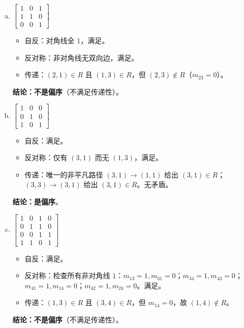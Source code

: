 \documentclass[11pt,UTF8]{article}
\begin{document}
\begin{enumerate}[a)]
    \item $\begin{bmatrix} 1 & 0 & 1 \\ 1 & 1 & 0 \\ 0 & 0 & 1 \end{bmatrix}$
    \begin{itemize}
        \item 自反：对角线全 $1$，满足。
        \item 反对称：非对角线无双向边，满足。
        \item 传递：$(2,1) \in R$ 且 $(1,3) \in R$，但 $(2,3) \notin R$（$m_{23}=0$）。
    \end{itemize}
    \textbf{结论：不是偏序}（不满足传递性）。

    \item $\begin{bmatrix} 1 & 0 & 0 \\ 0 & 1 & 0 \\ 1 & 0 & 1 \end{bmatrix}$
    \begin{itemize}
        \item 自反：满足。
        \item 反对称：仅有 $(3,1)$ 而无 $(1,3)$，满足。
        \item 传递：唯一的非平凡路径 $(3,1)\to(1,1)$ 给出 $(3,1) \in R$；$(3,3)\to(3,1)$ 给出 $(3,1) \in R$。无矛盾。
    \end{itemize}
    \textbf{结论：是偏序}。

    \item $\begin{bmatrix} 1 & 0 & 1 & 0 \\ 0 & 1 & 1 & 0 \\ 0 & 0 & 1 & 1 \\ 1 & 1 & 0 & 1 \end{bmatrix}$
    \begin{itemize}
        \item 自反：满足。
        \item 反对称：检查所有非对角线 $1$：$m_{13}=1,m_{31}=0$；$m_{34}=1,m_{43}=0$；$m_{41}=1,m_{14}=0$；$m_{42}=1,m_{24}=0$。满足。
        \item 传递：$(1,3) \in R$ 且 $(3,4) \in R$，但 $m_{14}=0$，故 $(1,4) \notin R$。
    \end{itemize}
    \textbf{结论：不是偏序}（不满足传递性）。
\end{enumerate}
\end{document}
